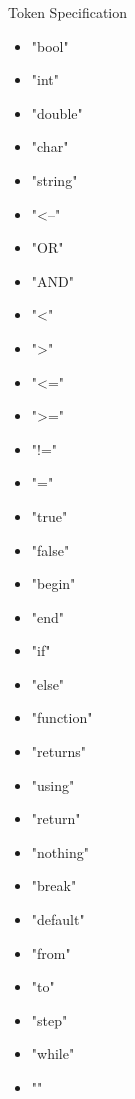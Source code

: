 
Token Specification 

\begin{itemize}

\item "bool"
\item "int"
\item "double"
\item "char"
\item "string"
\item "<--"
\item "OR"
\item "AND"
\item "<"
\item ">"
\item "<="
\item ">="
\item "!="
\item "="
\item "true"
\item "false"
\item "begin"
\item "end"
\item "if"
\item "else"
\item "function"
\item "returns"
\item "using"
\item "return"
\item "nothing"
\item "break"
\item "default"
\item "from"
\item "to"
\item "step"
\item "while"




\item ""
\end{itemize}